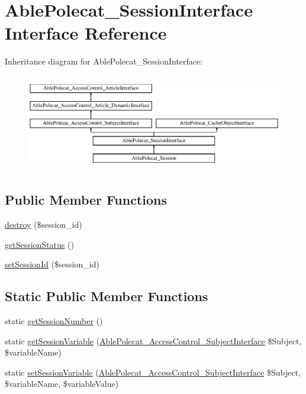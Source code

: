 \hypertarget{interface_able_polecat___session_interface}{}\section{Able\+Polecat\+\_\+\+Session\+Interface Interface Reference}
\label{interface_able_polecat___session_interface}
Inheritance diagram for Able\+Polecat\+\_\+\+Session\+Interface\+:\begin{figure}[H]
\begin{center}
\leavevmode
\includegraphics[height=4.268293cm]{interface_able_polecat___session_interface}
\end{center}
\end{figure}
\subsection*{Public Member Functions}
\begin{DoxyCompactItemize}
\item 
\hyperlink{interface_able_polecat___session_interface_aaec5812f6b4eb6835f88d3baa06a002a}{destroy} (\$session\+\_\+id)
\item 
\hyperlink{interface_able_polecat___session_interface_a4f9d8c32820bd2ece69d36d4375baa6b}{get\+Session\+Status} ()
\item 
\hyperlink{interface_able_polecat___session_interface_a89c236b6e327f2fe058c4a7b32a10f9d}{set\+Session\+Id} (\$session\+\_\+id)
\end{DoxyCompactItemize}
\subsection*{Static Public Member Functions}
\begin{DoxyCompactItemize}
\item 
static \hyperlink{interface_able_polecat___session_interface_aec7157d76bfc0a3a0f577f90fae7bc33}{get\+Session\+Number} ()
\item 
static \hyperlink{interface_able_polecat___session_interface_a8b8c4e7cd29f54e85cbde74c21f22250}{get\+Session\+Variable} (\hyperlink{interface_able_polecat___access_control___subject_interface}{Able\+Polecat\+\_\+\+Access\+Control\+\_\+\+Subject\+Interface} \$Subject, \$variable\+Name)
\item 
static \hyperlink{interface_able_polecat___session_interface_aa518ae714a59feda52322b4a27283ba8}{set\+Session\+Variable} (\hyperlink{interface_able_polecat___access_control___subject_interface}{Able\+Polecat\+\_\+\+Access\+Control\+\_\+\+Subject\+Interface} \$Subject, \$variable\+Name, \$variable\+Value)
\end{DoxyCompactItemize}


